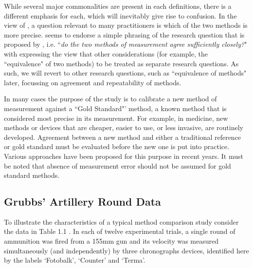 \documentclass[12pt, a4paper]{report}
\theoremstyle{plain}
\theoremstyle{definition}
\theoremstyle{remark}
\begin{document}
	 
	While several major commonalities are present in each definitions, there is a different emphasis for each, which will inevitably give rise to confusion. In the view of \citet{DunnSEME}, a question relevant to many practitioners is which of the two methods is more precise. \citet{BXC2010} seems to endorse a simple phrasing of the research question that is proposed by \citet{BA83}, i.e. ``\textit{do the two methods of measurement agree sufficiently closely?}" with \citet{BXC2010} expressing the view that other considerations (for example, the ``equivalence" of two methods) to be treated as separate research questions. As such, we will revert to other research questions, such as ``equivalence of methods" later, focussing on agreement and repeatability of methods.
	
	In many cases the purpose of the study is to calibrate a new method of measurement against a ``Gold Standard"’ method, a known method that is considered most precise in its measurement. For example, in medicine, new methods or devices that are cheaper, easier to use, or less invasive, are routinely developed. Agreement between a new method and either a traditional reference or gold standard must be evaluated before the new one is put into practice. Various approaches have been proposed for this purpose in recent years. It must be noted that absence of measurement error should not be assumed for gold standard methods.
	
	
\subsection{Grubbs' Artillery Round Data}	

	To illustrate the characteristics of a typical method comparison
	study consider the data in Table 1.1 \citep{Grubbs73}. In each of
	twelve experimental trials, a single round of ammunition was fired
	from a 155mm gun and its velocity was measured simultaneously (and
	independently) by three chronographs devices, identified here by
	the labels `Fotobalk', `Counter' and `Terma'.
	\smallskip
	
\end{document}
